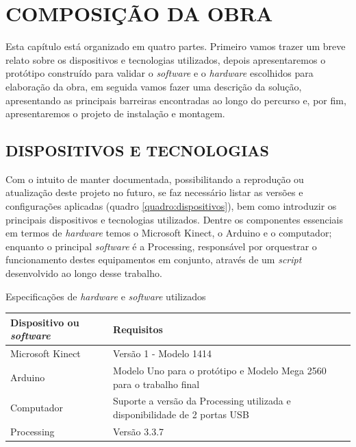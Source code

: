 \chapter{COMPOSIÇÃO DA OBRA}
Esta capítulo está organizado em quatro partes. Primeiro vamos trazer um breve relato sobre os dispositivos e tecnologias utilizados, depois apresentaremos o protótipo construído para validar o \textit{software} e o \textit{hardware} escolhidos para elaboração da obra, em seguida vamos fazer uma descrição da solução, apresentando as principais barreiras encontradas ao longo do percurso e, por fim, apresentaremos o projeto de instalação e montagem. 

\section{DISPOSITIVOS E TECNOLOGIAS}

Com o intuito de manter documentada, possibilitando a reprodução ou atualização deste projeto no futuro, se faz necessário listar as versões e configurações aplicadas (quadro \ref{quadro:dispositivos}), bem como introduzir os principais dispositivos e tecnologias utilizados. Dentre os componentes essenciais em termos de \textit{hardware} temos o Microsoft Kinect, o Arduino e o computador; enquanto o principal \textit{software} é a Processing, responsável por orquestrar o funcionamento destes equipamentos em conjunto, através de um \textit{script} desenvolvido ao longo desse trabalho. 


\begin{quadro}[H]
\caption{\label{quadro:dispositivos}Especificações de \textit{hardware} e \textit{software} utilizados}
\begin{center}  
  \begin{tabulary}{0.8\textwidth}{|L|L|}
  
  \hline
  \textbf{Dispositivo ou \textit{software}} & \textbf{Requisitos} \\ \hline
  Microsoft Kinect  & Versão 1 - Modelo 1414 \\ \hline
  Arduino & Modelo Uno para o protótipo e Modelo Mega 2560 para o trabalho final \\ \hline
  Computador & Suporte a versão da Processing utilizada e disponibilidade de 2 portas USB \\ \hline
  Processing & Versão 3.3.7 \\ \hline
  \end{tabulary}
\end{center}
\vspace*{-0,7cm}
\\
\end{quadro}


